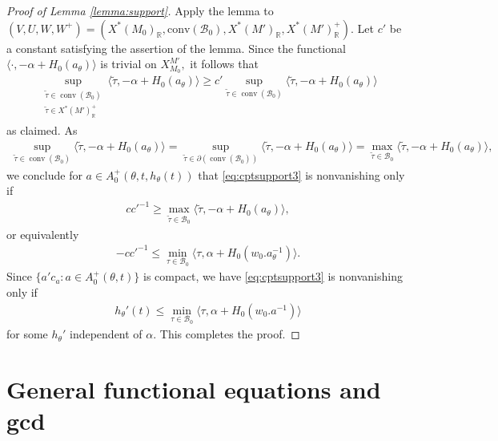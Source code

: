 \documentclass[10pt]{amsart}
\theoremstyle{definition}
\numberwithin{equation}{section}
\numberwithin{equation}{subsection}
\newcommand{\RR}{\mathbb{R}}
\newcommand{\calB}{\mathcal{B}}
\begin{document}
\begin{proof}[Proof of Lemma \ref{lemma:support}]
Apply the lemma to $(V,U,W,W^+) = (X^*(M_0)_\RR,\mathrm{conv}(\mathcal{B}_0),X^*(M')_\RR,X^*(M')^+_\RR).$ Let $c'$ be a constant satisfying the assertion of the lemma. Since the functional $\langle\cdot,-\alpha+H_0(a_\theta)\rangle$ is trivial on $X_{M_0}^{M'},$ it follows that
\begin{align*}
     \sup_{\substack{\tilde{\tau}\in\mathop{\mathrm{conv}}(\mathcal{B}_0)\\\tilde{\tau}\in X^*(M')^+_\mathbb{R}}}\langle \tilde{\tau},-\alpha+H_0(a_\theta)\rangle\ge c'\sup_{\tilde{\tau}\in\mathop{\mathrm{conv}}(\mathcal{B}_0)}\langle \tilde{\tau},-\alpha+H_0(a_\theta)\rangle
\end{align*}
as claimed. As 
\begin{align*}
    \sup_{\tilde{\tau}\in\mathop{\mathrm{conv}}(\mathcal{B}_0)}\langle \tilde{\tau},-\alpha+H_0(a_\theta)\rangle =  \sup_{\tilde{\tau}\in\partial(\mathop{\mathrm{conv}}(\mathcal{B}_0))}\langle \tilde{\tau},-\alpha+H_0(a_\theta)\rangle = \max_{\tilde{\tau}\in\mathcal{B}_0}\langle \tilde{\tau},-\alpha+H_0(a_\theta)\rangle, 
\end{align*}
we conclude for $a\in A_0^+(\theta,t,h_
\theta(t))$ that \eqref{eq:cptsupport3} is nonvanishing only if 
\begin{align*}
    cc'^{-1}\geq \max_{\tilde{\tau}\in\mathcal{B}_0}\langle \tilde{\tau},-\alpha+H_0(a_\theta)\rangle,
\end{align*}
or equivalently
\begin{align*}
    -cc'^{-1}\le  \min_{\tau\in \calB_0} \langle \tau,\alpha+H_0( w_0.a_\theta^{-1})\rangle.
\end{align*}
Since $\{ a'c_a:a\in A_0^+(\theta,t)\}$ is compact, we have \eqref{eq:cptsupport3} is nonvanishing only if
\begin{align*}
    h_{\theta}'(t)\le\min_{\tau\in \calB_0} \langle \tau,\alpha+H_0( w_0.a^{-1})\rangle
\end{align*}
for some $h_{\theta}'$ independent of $\alpha$. This completes the proof.
\end{proof}



\section{General functional equations and gcd}\label{sec:FunctEq}
\end{document}
